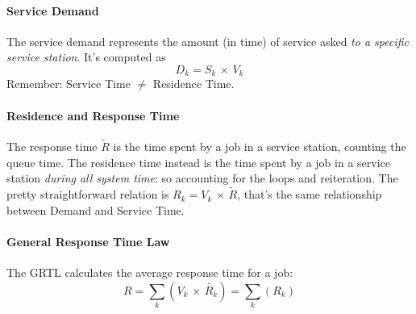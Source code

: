 \documentclass{article}
\begin{document}
				\paragraph{Service Demand}
					The service demand represents the amount (in time) of service asked \emph{to a specific service station}. It's computed as
					\begin{equation}
						D_k = S_k \,\times\, V_k
					\end{equation}
					Remember: Service Time $\neq$ Residence Time. 
					
				\paragraph{Residence and Response Time}
					The response time $\tilde{R}$ is the time spent by a job in a service station, counting the queue time. The residence time instead is the time spent by a job in a service station \emph{during all system time}: so accounting for the loops and reiteration. The pretty straightforward relation is $R_k = V_k \,\times\, \tilde{R}$, that's the same relationship between Demand and Service Time. 
					
				\paragraph{General Response Time Law}
					The GRTL calculates the average response time for a job:
					\begin{equation}
						R = \sum_k (V_k \,\times\, \tilde{R_k}) = \sum_k (R_k)
					\end{equation}
					
\end{document}
